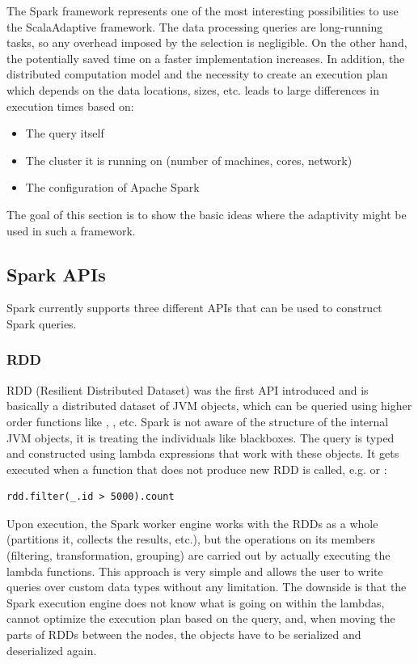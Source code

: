 The Spark framework represents one of the most interesting possibilities to use the ScalaAdaptive framework. The data processing queries are long-running tasks, so any overhead imposed by the selection is negligible. On the other hand, the potentially saved time on a faster implementation increases. In addition, the distributed computation model and the necessity to create an execution plan which depends on the data locations, sizes, etc. leads to large differences in execution times based on:

\begin{itemize}
	\item The query itself
	\item The cluster it is running on (number of machines, cores, network)
	\item The configuration of Apache Spark
\end{itemize}

The goal of this section is to show the basic ideas where the adaptivity might be used in such a framework.

\subsection{Spark APIs}
\label{subsec:spark_apis}

Spark currently supports three different APIs that can be used to construct Spark queries.

\subsubsection{RDD}

RDD (Resilient Distributed Dataset) was the first API introduced and is basically a distributed dataset of JVM objects, which can be queried using higher order functions like , , etc. Spark is not aware of the structure of the internal JVM objects, it is treating the individuals like blackboxes. The query is typed and constructed using lambda expressions that work with these objects. It gets executed when a function that does not produce new RDD is called, e.g.  or :

\lstset{style=Scala}
\begin{lstlisting}
rdd.filter(_.id > 5000).count
\end{lstlisting}

Upon execution, the Spark worker engine works with the RDDs as a whole (partitions it, collects the results, etc.), but the operations on its members (filtering, transformation, grouping) are carried out by actually executing the lambda functions. This approach is very simple and allows the user to write queries over custom data types without any limitation. The downside is that the Spark execution engine does not know what is going on within the lambdas, cannot optimize the execution plan based on the query, and, when moving the parts of RDDs between the nodes, the objects have to be serialized and deserialized again.

